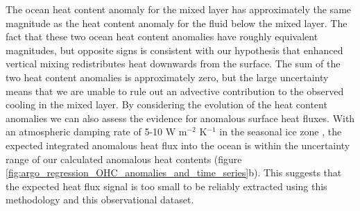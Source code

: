 \documentclass{ametsocV5}
\begin{document}
The ocean heat content anomaly for the mixed layer has approximately the same magnitude as the heat content anomaly for the fluid below the mixed layer. The fact that these two ocean heat content anomalies have roughly equivalent magnitudes, but opposite signs is consistent with our hypothesis that enhanced vertical mixing redistributes heat downwards from the surface. The sum of the two heat content anomalies is approximately zero, but the large uncertainty means that we are unable to rule out an advective contribution to the observed cooling in the mixed layer. By considering the evolution of the heat content anomalies we can also assess the evidence for anomalous surface heat fluxes. With an atmospheric damping rate of 5-10 W m$^{-2}$ K$^{-1}$ in the seasonal ice zone \citep{Hausmann2016}, the expected integrated anomalous heat flux into the ocean is within the uncertainty range of our calculated anomalous heat contents (figure \ref{fig:argo_regression_OHC_anomalies_and_time_series}b). This suggests that the expected heat flux signal is too small to be reliably extracted using this methodology and this observational dataset.
\end{document}
